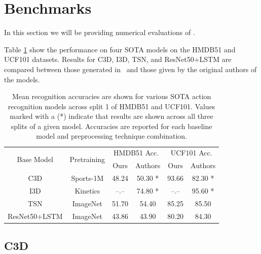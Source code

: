 \documentclass{llncs}
\begin{document}
\section{Benchmarks}
\label{sec:benchmarks}
In this section we will be providing numerical evaluations of \acro.

Table \ref{tab:model_results} show the performance on four SOTA models on the HMDB51 and UCF101 datasets.
Results for C3D, I3D, TSN, and ResNet50+LSTM are compared between those generated in \acro~and those given by the original authors of the models.

\begin{table}[h!]
\begin{center}
\caption{Mean recognition accuracies are shown for various SOTA action recognition models across split 1 of HMDB51 and UCF101.
Values marked with a (*) indicate that results are shown across all three splits of a given model.
Accuracies are reported for each baseline model and preprocessing technique combination.}
\label{tab:model_results}
\begin{tabular}{c|c|c|c||c|c}
\hline
\multirow{2}{*}{Base Model} & \multirow{2}{*}{Pretraining} & \multicolumn{2}{c||}{HMDB51 Acc.} & \multicolumn{2}{c}{UCF101 Acc.} \\\cline{3-6}
& & Ours & Authors & Ours & Authors \\
\hline
C3D & Sports-1M & 48.24 & 50.30 * & 93.66 & 82.30 * \\
\hline
I3D & Kinetics & --.-- & 74.80 * & --.-- & 95.60 * \\
\hline
TSN & ImageNet & 51.70 & 54.40 & 85.25 & 85.50 \\
\hline
ResNet50+LSTM & ImageNet & 43.86 & 43.90 & 80.20 & 84.30 \\
\hline
\end{tabular}
\end{center}
\end{table}


\subsection{C3D}
\label{sec:c3d}
\end{document}
